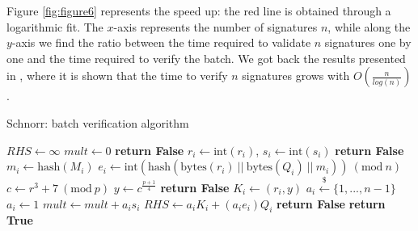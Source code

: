 \bigskip
\noindent
Figure \ref{fig:figure6} represents the speed up: the red line is obtained through a logarithmic fit. The $x$-axis represents the number of signatures $n$, while along the $y$-axis we find the ratio between the time required to validate $n$ signatures one by one and the time required to verify the batch. We got back the results presented in \cite{RefWork:5}, where it is shown that the time to verify $n$ signatures grows with $O\left(\frac{n}{log(n)}\right)$.

\begin{algorithm}
	\caption{Schnorr: batch verification algorithm}
	\label{alg:schnorr_batch}
	\begin{algorithmic}[1]
		\State $RHS \gets \infty$
		\State $mult \gets 0$
		\State \textbf{return False}
		\EndIf
		\State $r_i \gets \text{int}(r_i)$, $s_i \gets \text{int}(s_i)$
		\State \textbf{return False}
		\EndIf
		\State $m_i \gets \text{hash}(M_i)$
		\State $e_i \gets \text{int}(\text{hash}(\text{bytes}(r_i) \ || \ \text{bytes}(Q_i) \ || \ m_i)) \ (\text{mod} \ n)$
		\State $c \gets r^3 + 7 \ (\text{mod} \ p)$
		\State $y \gets c^{\frac{p + 1}{4}}$
		\State \textbf{return False}
		\EndIf
		\State $K_i \gets (r_i, y)$
		\State  $a_i \xleftarrow{\text{\$}} \{1, ..., n - 1\}$ 
		\Else
		\State $a_i \gets 1$
		\EndIf
		\State $mult \gets mult + a_is_i$
		\State $RHS \gets a_iK_i + (a_ie_i)Q_i$
		\EndFor
		\State \textbf{return False}
		\EndIf
		\State \textbf{return True}
		\EndProcedure	
	\end{algorithmic}
\end{algorithm}
